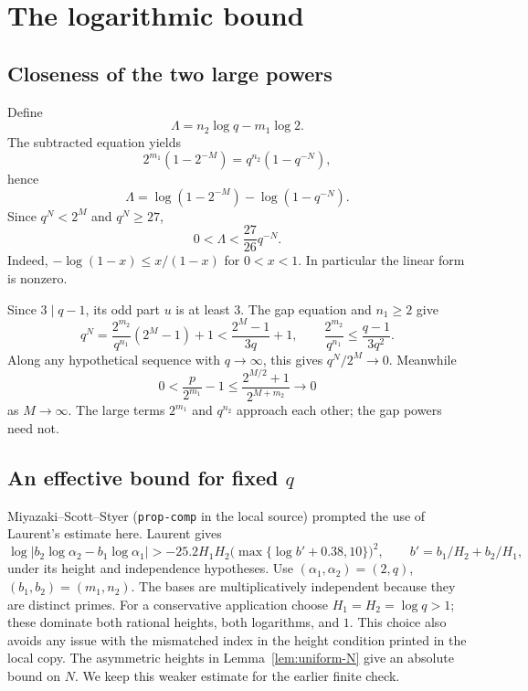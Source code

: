 \documentclass[11pt]{article}
\begin{document}
\section{The logarithmic bound}
\label{sec:logarithms}

\subsection{Closeness of the two large powers}

Define
\[
\Lambda=n_2\log q-m_1\log2.
\]
The subtracted equation yields
\[
2^{m_1}(1-2^{-M})=q^{n_2}(1-q^{-N}),
\]
hence
\[
\Lambda=\log(1-2^{-M})-\log(1-q^{-N}).
\]
Since $q^N<2^M$ and $q^N\geq27$,
\begin{equation}\label{eq:lambda-upper}
\boxed{0<\Lambda<\frac{27}{26}q^{-N}.}
\end{equation}
Indeed, $-\log(1-x)\leq x/(1-x)$ for $0<x<1$.
In particular the linear form is nonzero.

Since $3\mid q-1$, its odd part $u$ is at least $3$. The gap equation
and $n_1\geq2$ give
\begin{equation}\label{eq:gap-ratio}
q^N=\frac{2^{m_2}}{q^{n_1}}(2^M-1)+1
 <\frac{2^M-1}{3q}+1,
\qquad \frac{2^{m_2}}{q^{n_1}}\leq\frac{q-1}{3q^2}.
\end{equation}
Along any hypothetical sequence with $q\to\infty$, this gives
$q^N/2^M\to0$. Meanwhile
\[
0<\frac{p}{2^{m_1}}-1
 \leq\frac{2^{M/2}+1}{2^{M+m_2}}\longrightarrow0
\]
as $M\to\infty$. The large terms $2^{m_1}$ and $q^{n_2}$ approach
each other; the gap powers need not.

\subsection{\texorpdfstring{An effective bound for fixed $q$}{An effective bound for fixed q}}

Miyazaki--Scott--Styer \cite[Proposition~6.1]{MSS}
(\texttt{prop-comp} in the local source) prompted the use of
Laurent's estimate here. Laurent \cite[Corollary~2]{Laurent} gives
\[
\log|b_2\log\alpha_2-b_1\log\alpha_1|
>-25.2H_1H_2\bigl(\max\{\log b'+0.38,10\}\bigr)^2,
\qquad b'=b_1/H_2+b_2/H_1,
\]
under its height and independence hypotheses.
Use $(\alpha_1,\alpha_2)=(2,q)$, $(b_1,b_2)=(m_1,n_2)$.
The bases are multiplicatively independent because they are distinct primes.
For a conservative application choose $H_1=H_2=\log q>1$;
these dominate both rational heights, both logarithms, and $1$.
This choice also avoids any issue with the mismatched index in the height
condition printed in the local copy. The asymmetric heights in Lemma~\ref{lem:uniform-N} give an absolute
bound on $N$. We keep this weaker estimate for the earlier finite check.
\end{document}
